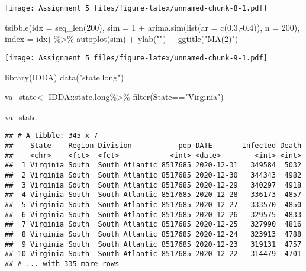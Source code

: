 \documentclass[
]{article}
\newenvironment{Shaded}{\begin{snugshade}}{\end{snugshade}}
\newcommand{\AttributeTok}[1]{\textcolor[rgb]{0.77,0.63,0.00}{#1}}
\newcommand{\DecValTok}[1]{\textcolor[rgb]{0.00,0.00,0.81}{#1}}
\newcommand{\FloatTok}[1]{\textcolor[rgb]{0.00,0.00,0.81}{#1}}
\newcommand{\FunctionTok}[1]{\textcolor[rgb]{0.00,0.00,0.00}{#1}}
\newcommand{\NormalTok}[1]{#1}
\newcommand{\OtherTok}[1]{\textcolor[rgb]{0.56,0.35,0.01}{#1}}
\newcommand{\SpecialCharTok}[1]{\textcolor[rgb]{0.00,0.00,0.00}{#1}}
\newcommand{\StringTok}[1]{\textcolor[rgb]{0.31,0.60,0.02}{#1}}
\begin{document}
\texttt{[image: Assignment\_5\_files/figure-latex/unnamed-chunk-8-1.pdf]}

\begin{Shaded}
\begin{Highlighting}[]
\FunctionTok{tsibble}\NormalTok{(}\AttributeTok{idx =} \FunctionTok{seq\_len}\NormalTok{(}\DecValTok{200}\NormalTok{), }\AttributeTok{sim =} \DecValTok{1} \SpecialCharTok{+} \FunctionTok{arima.sim}\NormalTok{(}\FunctionTok{list}\NormalTok{(}\AttributeTok{ar =} \FunctionTok{c}\NormalTok{(}\FloatTok{0.3}\NormalTok{,}\SpecialCharTok{{-}}\FloatTok{0.4}\NormalTok{)), }\AttributeTok{n =} \DecValTok{200}\NormalTok{), }\AttributeTok{index =}\NormalTok{ idx) }\SpecialCharTok{\%\textgreater{}\%}
\FunctionTok{autoplot}\NormalTok{(sim) }\SpecialCharTok{+} \FunctionTok{ylab}\NormalTok{(}\StringTok{""}\NormalTok{) }\SpecialCharTok{+} \FunctionTok{ggtitle}\NormalTok{(}\StringTok{"MA(2)"}\NormalTok{)}
\end{Highlighting}
\end{Shaded}

\texttt{[image: Assignment\_5\_files/figure-latex/unnamed-chunk-9-1.pdf]}

\begin{Shaded}
\begin{Highlighting}[]
\FunctionTok{library}\NormalTok{(IDDA)}
\FunctionTok{data}\NormalTok{(}\StringTok{"state.long"}\NormalTok{)}
\end{Highlighting}
\end{Shaded}

\begin{Shaded}
\begin{Highlighting}[]
\NormalTok{va\_state}\OtherTok{\textless{}{-}}\NormalTok{ IDDA}\SpecialCharTok{::}\NormalTok{state.long}\SpecialCharTok{\%\textgreater{}\%}
  \FunctionTok{filter}\NormalTok{(State}\SpecialCharTok{==}\StringTok{"Virginia"}\NormalTok{)}

\NormalTok{va\_state}
\end{Highlighting}
\end{Shaded}

\begin{verbatim}
## # A tibble: 345 x 7
##    State    Region Division           pop DATE       Infected Death
##    <chr>    <fct>  <fct>            <int> <date>        <int> <int>
##  1 Virginia South  South Atlantic 8517685 2020-12-31   349584  5032
##  2 Virginia South  South Atlantic 8517685 2020-12-30   344343  4982
##  3 Virginia South  South Atlantic 8517685 2020-12-29   340297  4918
##  4 Virginia South  South Atlantic 8517685 2020-12-28   336173  4857
##  5 Virginia South  South Atlantic 8517685 2020-12-27   333570  4850
##  6 Virginia South  South Atlantic 8517685 2020-12-26   329575  4833
##  7 Virginia South  South Atlantic 8517685 2020-12-25   327990  4816
##  8 Virginia South  South Atlantic 8517685 2020-12-24   323913  4788
##  9 Virginia South  South Atlantic 8517685 2020-12-23   319131  4757
## 10 Virginia South  South Atlantic 8517685 2020-12-22   314479  4701
## # ... with 335 more rows
\end{verbatim}
\end{document}
